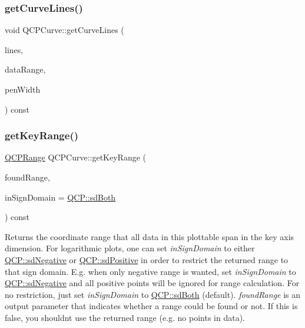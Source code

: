 \subsubsection{\texorpdfstring{getCurveLines()}{getCurveLines()}}
{\footnotesize\ttfamily void Q\+C\+P\+Curve\+::get\+Curve\+Lines (\begin{DoxyParamCaption}\item[{Q\+Vector$<$ Q\+PointF $>$ $\ast$}]{lines,  }\item[{const \mbox{\hyperlink{class_q_c_p_data_range}{Q\+C\+P\+Data\+Range}} \&}]{data\+Range,  }\item[{double}]{pen\+Width }\end{DoxyParamCaption}) const\hspace{0.3cm}{\ttfamily [protected]}}

\mbox{\label{class_q_c_p_curve_a22d09087f78f254731197cc0b8783299}} 
\subsubsection{\texorpdfstring{getKeyRange()}{getKeyRange()}}
{\footnotesize\ttfamily \mbox{\hyperlink{class_q_c_p_range}{Q\+C\+P\+Range}} Q\+C\+P\+Curve\+::get\+Key\+Range (\begin{DoxyParamCaption}\item[{bool \&}]{found\+Range,  }\item[{\mbox{\hyperlink{namespace_q_c_p_afd50e7cf431af385614987d8553ff8a9}{Q\+C\+P\+::\+Sign\+Domain}}}]{in\+Sign\+Domain = {\ttfamily \mbox{\hyperlink{namespace_q_c_p_afd50e7cf431af385614987d8553ff8a9aa38352ef02d51ddfa4399d9551566e24}{Q\+C\+P\+::sd\+Both}}} }\end{DoxyParamCaption}) const\hspace{0.3cm}{\ttfamily [virtual]}}

Returns the coordinate range that all data in this plottable span in the key axis dimension. For logarithmic plots, one can set {\itshape in\+Sign\+Domain} to either \mbox{\hyperlink{namespace_q_c_p_afd50e7cf431af385614987d8553ff8a9a2d18af0bc58f6528d1e82ce699fe4829}{Q\+C\+P\+::sd\+Negative}} or \mbox{\hyperlink{namespace_q_c_p_afd50e7cf431af385614987d8553ff8a9a584784b75fb816abcc627cf743bb699f}{Q\+C\+P\+::sd\+Positive}} in order to restrict the returned range to that sign domain. E.\+g. when only negative range is wanted, set {\itshape in\+Sign\+Domain} to \mbox{\hyperlink{namespace_q_c_p_afd50e7cf431af385614987d8553ff8a9a2d18af0bc58f6528d1e82ce699fe4829}{Q\+C\+P\+::sd\+Negative}} and all positive points will be ignored for range calculation. For no restriction, just set {\itshape in\+Sign\+Domain} to \mbox{\hyperlink{namespace_q_c_p_afd50e7cf431af385614987d8553ff8a9aa38352ef02d51ddfa4399d9551566e24}{Q\+C\+P\+::sd\+Both}} (default). {\itshape found\+Range} is an output parameter that indicates whether a range could be found or not. If this is false, you shouldn\textquotesingle{}t use the returned range (e.\+g. no points in data).

